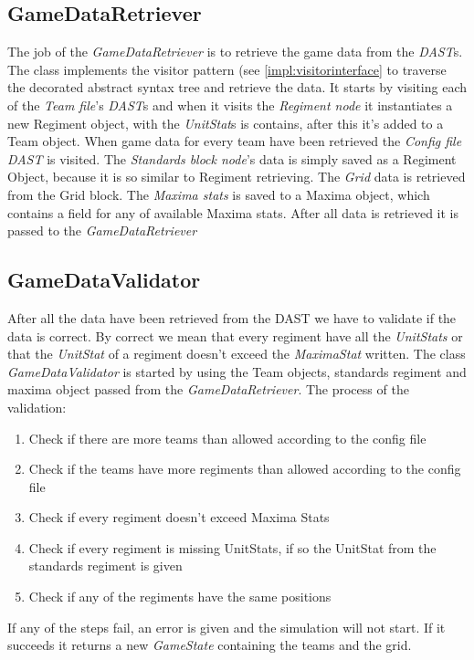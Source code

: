 \subsection{GameDataRetriever}
	The job of the {\it GameDataRetriever} is to retrieve the game data from the {\it DAST}s. The class implements the visitor pattern
	(see \ref{impl:visitorinterface} to traverse the decorated abstract syntax tree and retrieve the data. 
	It starts by visiting each of the {\it Team file}'s {\it DAST}s and when it visits the {\it Regiment node} it instantiates a new Regiment object, 
	with the {\it UnitStat}s is contains, after this it's added to a Team object. When game data for every team have been retrieved the {\it Config file}
	{\it DAST} is visited. The {\it Standards block node}'s data is simply saved as a Regiment Object, because it is so similar to Regiment retrieving. 
	The {\it Grid} data is retrieved from the Grid block. The {\it Maxima stats} is saved to a Maxima object, which contains a field for any of available 
	Maxima stats. After all data is retrieved it is passed to the {\it GameDataRetriever}

\subsection{GameDataValidator}
	After all the data have been retrieved from the DAST we have to validate if the data is correct. 
	By correct we mean that every regiment have all the {\it UnitStats} or that the {\it UnitStat} 
	of a regiment doesn't exceed the {\it MaximaStat} written. 
	The class {\it GameDataValidator} is started by using the Team objects, standards regiment and maxima object passed from the {\it GameDataRetriever}.
	The process of the validation: \\
	\begin{enumerate}
		\item Check if there are more teams than allowed according to the config file
		\item Check if the teams have more regiments than allowed according to the config file
		\item Check if every regiment doesn't exceed Maxima Stats
		\item Check if every regiment is missing UnitStats, if so the UnitStat from the standards regiment is given
		\item Check if any of the regiments have the same positions
	\end{enumerate}
	If any of the steps fail, an error is given and the simulation will not start. If it succeeds it returns a new {\it GameState} containing the teams 
	and the grid.
	
